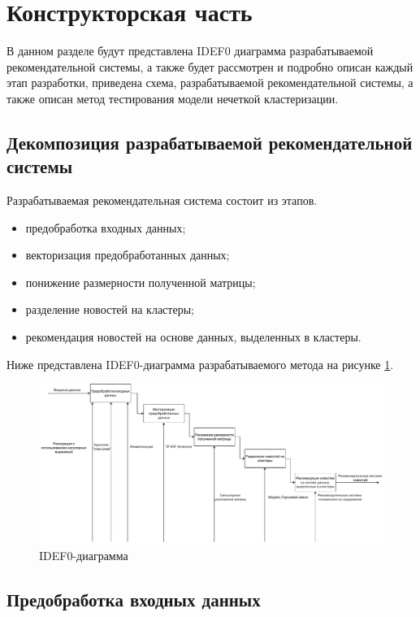 \section{Конструкторская часть}

В данном разделе будут представлена IDEF0 диаграмма разрабатываемой рекомендательной системы, а также будет рассмотрен и подробно описан каждый этап разработки, приведена схема, разрабатываемой рекомендательной системы, а также описан метод тестирования модели нечеткой кластеризации.

\subsection{Декомпозиция разрабатываемой рекомендательной системы}

Разрабатываемая рекомендательная система состоит из этапов.

\begin{itemize}
	\item предобработка входных данных;
	\item векторизация предобработанных данных;
	\item понижение размерности полученной матрицы;
	\item разделение новостей на кластеры;
	\item рекомендация новостей на основе данных, выделенных в кластеры.
\end{itemize}

Ниже представлена IDEF0-диаграмма разрабатываемого метода на рисунке \ref{idef0_big}.

\begin{figure}[H]
	\centering
	\includegraphics[width=\textwidth]{img/idef0_big.pdf}
	\caption{IDEF0-диаграмма}
	\label{idef0_big}
\end{figure}  

\subsection{Предобработка входных данных}

